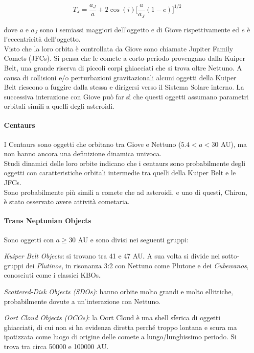 \documentclass[a4paper,11pt,openright]{book}
\begin{document}
\begin{equation}
    T_J=\frac{a_J}{a}+2\cos(i)\biggl[\frac{a}{a_J}(1-e)\biggr]^{1/2}
\end{equation}

dove $a$ e $a_J$ sono i semiassi maggiori dell'oggetto e di Giove rispettivamente ed $e$ è l'eccentricità dell'oggetto.\\
Visto che la loro orbita è controllata da Giove sono chiamate Jupiter Family Comets (JFCs). Si pensa che le comete a corto periodo provengano dalla Kuiper Belt, una grande riserva di piccoli corpi ghiacciati che si trova oltre Nettuno. A causa di collisioni e/o perturbazioni gravitazionali alcuni oggetti della Kuiper Belt riescono a fuggire dalla stessa e dirigersi verso il Sistema Solare interno. La successiva interazione con Giove può far sì che questi oggetti assumano parametri orbitali simili a quelli degli asteroidi.

\paragraph*{Centaurs}
I Centaurs sono oggetti che orbitano tra Giove e Nettuno ($5.4<a<30$ AU), ma non hanno ancora una definizione dinamica univoca.\\
Studi dinamici delle loro orbite indicano che i centaurs sono probabilmente degli oggetti con caratteristiche orbitali intermedie tra quelli della Kuiper Belt e le JFCs.\\
Sono probabilmente più simili a comete che ad asteroidi, e uno di questi, Chiron, è stato osservato avere attività cometaria.

\paragraph*{Trans Neptunian Objects}
Sono oggetti con $a\geq 30$ AU e sono divisi nei seguenti gruppi:

\qquad \textit{Kuiper Belt Objects}: si trovano tra 41 e 47 AU. A sua volta si divide nei sotto-gruppi dei \textit{Plutinos}, in risonanza 3:2 con Nettuno come Plutone e dei \textit{Cubewanos}, conosciuti come i classici KBOs.

\qquad \textit{Scattered-Disk Objects (SDOs)}: hanno orbite molto grandi e molto ellittiche, probabilmente dovute a un’interazione con Nettuno.

\qquad \textit{Oort Cloud Objects (OCOs)}: la Oort Cloud è una shell sferica di oggetti ghiacciati, di cui non si ha evidenza diretta perché troppo lontana e scura ma ipotizzata come luogo di origine delle comete a lungo/lunghissimo periodo. Si trova tra circa 50000 e 100000 AU.
\end{document}
